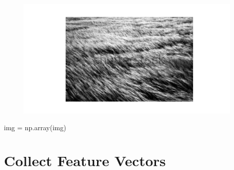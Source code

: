 \documentclass[
  letterpaper,
  DIV=11,
  numbers=noendperiod]{scrreprt}
\newenvironment{Shaded}{\begin{snugshade}}{\end{snugshade}}
\newcommand{\NormalTok}[1]{\textcolor[rgb]{0.00,0.23,0.31}{#1}}
\newcommand{\OperatorTok}[1]{\textcolor[rgb]{0.37,0.37,0.37}{#1}}
\begin{document}
\begin{figure}[H]

{\centering \includegraphics{results_files/figure-pdf/unnamed-chunk-2-3.pdf}

}

\end{figure}

\begin{Shaded}
\begin{Highlighting}[]

\NormalTok{img }\OperatorTok{=}\NormalTok{ np.array(img)}
\end{Highlighting}
\end{Shaded}

\hypertarget{collect-feature-vectors}{%
\section{Collect Feature Vectors}\label{collect-feature-vectors}}
\end{document}
